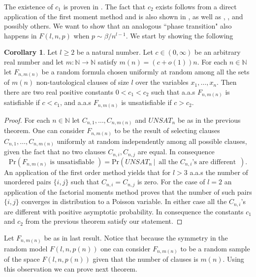 \documentclass[12pt,notitlepage,a4paper]{article}
\theoremstyle{definition}
\newtheorem{corollary}{Corollary}[section]
\newcommand{\N}{\mathbb{N}}
\begin{document}
The existence of $c_1$ is proven in \cite[Theorem 1]{chvatal1992mick}.
The fact that $c_2$ exists follows from a direct application of
the first moment method and is also shown in \cite{chvatal1992mick}, as well as 
\cite{franco1983probabilistic}, \cite{chvatal1988many}, \cite{simon1986etude}
and possibly others. We want to show that an analogous ``phase transition" also happens in
$F(l,n,p)$ when $p\sim \beta/n^{l-1}$. We start by showing the following
\begin{corollary}
	Let $l\geq 2$ be a natural number. Let $c\in (0,\infty)$ be an arbitrary
	real number and let $m:\N\rightarrow \N$ satisfy $m(n)=(c+o(1))n$. 
	For each $n\in \N$ let $F_{n,m(n)}$ be a random formula chosen uniformly at
	random among all the sets of $m(n)$ non-tautological clauses of size $l$ over
	the variables $x_1,\dots, x_n$. Then there
	are two real positive constants $0<c_1<c_2$ such that
	a.a.s $F_{n,m(n)}$ is satisfiable if $c< c_1$, and
	a.a.s $F_{n,m(n)}$ is unsatisfiable if $c> c_2$.
\end{corollary}
\begin{proof}
For each $n\in \N$ let $C_{n,1},\dots, C_{n,m(n)}$ and $UNSAT_n$ be as in the previous theorem.
One can consider $F_{n,m(n)}$ to be the result of selecting clauses $C_{n,1},\dots, C_{n,m(n)}$
uniformly at random independently among all possible clauses, given the fact that
no two clauses $C_{n,i}, C_{n,j}$ are equal. In consequence 
\[
\mathrm{Pr} \left( F_{n,m(n)} \text{ is unsatisfiable } \right) 
=
\mathrm{Pr} \left(UNSAT_n \, \big| \, \text{ all the $C_{n,i}$'s are different }\,\right).
\] 
An application of the first
order method yields that for $l>3$ a.a.s the number of unordered pairs $\{i,j\}$ such that
$C_{n,i}=C_{n,j}$ is zero. For the case of $l=2$ an application of the factorial moments
method proves that the number of such pairs $\{i,j\}$ converges in distribution to 
a Poisson variable. In either case all the
$C_{n,i}$'s are different with positive asymptotic probability. 
In consequence the constants $c_1$ and $c_2$ from the previous theorem satisfy
our statement. 
\end{proof}

Let $F_{n,m(n)}$ be as in last result. Notice that because the symmetry in 
the random model $F(l,n,p(n))$ one can consider $F_{n,m(n)}$ to be a random
sample of the space $F(l,n,p(n))$ given that the number of clauses
is $m(n)$. Using this observation we can prove next theorem. 
  
\end{document}
